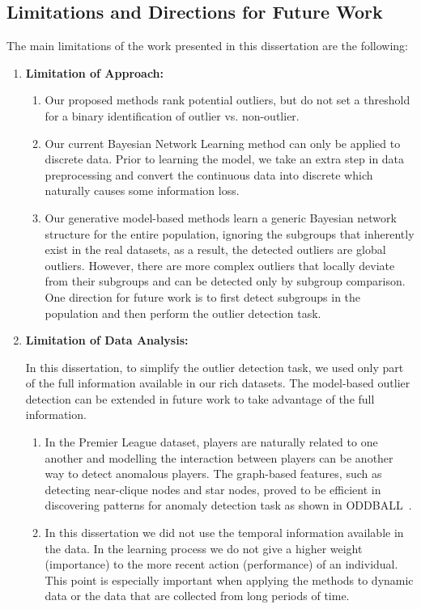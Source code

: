 \subsection{Limitations and Directions for Future Work}
The main limitations of the work presented in this dissertation are the following:
\begin{enumerate}
	\item \textbf{Limitation of Approach:} 
	\begin{enumerate}\item Our proposed methods rank potential outliers, but do not set a threshold for a binary identification of outlier vs. non-outlier.
		 \item Our current Bayesian Network Learning method can only be applied to discrete data. Prior to learning the model, we take an extra step in data preprocessing and convert the continuous data into discrete which naturally causes some information loss. \item Our generative model-based methods learn a generic Bayesian network structure for the entire population, ignoring the subgroups that inherently exist in the real datasets, as a result, the detected outliers are global outliers. However, there are  more complex outliers that locally deviate from their subgroups and can be detected only by subgroup comparison. One direction for future work is to first detect subgroups in the population and then perform the outlier detection task.
		\end{enumerate}
		\item \textbf{Limitation of Data Analysis: }
	
		In this dissertation, to simplify the outlier detection task, we used only part of the full information available in our rich datasets. The model-based outlier detection can be extended in future work to take advantage of the full information. 
			\begin{enumerate}
				\item In the Premier League dataset, players are naturally related to one another and modelling the interaction between players can be another way to detect anomalous players.
				The graph-based features, such as detecting near-clique nodes and star nodes, proved to be efficient in discovering patterns for anomaly detection task as shown in ODDBALL~\cite{Akoglu2010}.
					\item In this dissertation we did not use the temporal information available in the data. In the learning process we do not give a higher weight (importance) to the more recent action (performance) of an individual. This point is especially important when applying the methods to dynamic data or the data that are collected from long periods of time. 
			\end{enumerate}
		

\end{enumerate}

